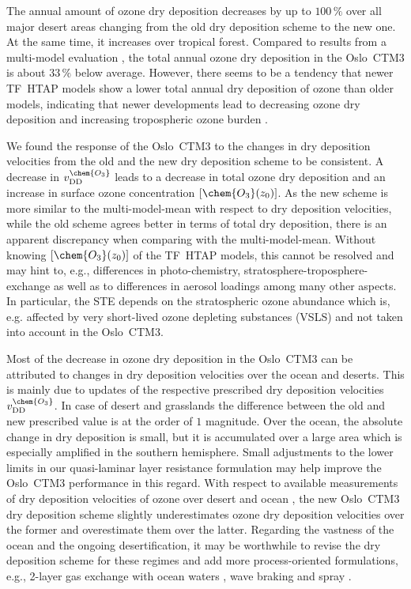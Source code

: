 \documentclass[gmd, manuscript]{copernicus}
\begin{document}
The annual amount of ozone dry deposition decreases by up to $100\,\unit{\%}$ over all major desert areas changing from the old dry deposition scheme to the new one. At the same time, it increases over tropical forest. Compared to results from a multi-model evaluation \citep{ACP:Hardacre2015}, the total annual ozone dry deposition in the Oslo~CTM3 is about $33\,\unit{\%}$ below average. However, there seems to be a tendency that newer TF~HTAP models show a lower total annual dry deposition of ozone than older models, indicating that newer developments lead to decreasing ozone dry deposition and increasing tropospheric ozone burden \citep[e.g.,][]{ACP:Luhar2017,ACP:Luhar2018,AE:Hu2017}.

We found the response of the Oslo~CTM3 to the changes in dry deposition velocities from the old and the new dry deposition scheme to be consistent. A decrease in $v_\text{DD}^\chem{O_3}$ leads to a decrease in total ozone dry deposition and an increase in surface ozone concentration $[\chem{O_3}(z_0)]$. As the new scheme is more similar to the multi-model-mean \citep{ACP:Hardacre2015} with respect to dry deposition velocities, while the old scheme agrees better in terms of total dry deposition, there is an apparent discrepancy when comparing with the multi-model-mean. Without knowing $[\chem{O_3}(z_0)]$ of the TF~HTAP models, this cannot be resolved and may hint to, e.g., differences in photo-chemistry, stratosphere-troposphere-exchange as well as to differences in aerosol loadings among many other aspects. In particular, the STE depends on the stratospheric ozone abundance which is, e.g. affected by very short-lived ozone depleting substances (VSLS) \citep{JGR:Warwick2006, ACP:Ziska2013, ACP:Hossaini2016, ACP:Falk2017} and not taken into account in the Oslo~CTM3.

Most of the decrease in ozone dry deposition in the Oslo~CTM3 can be attributed to changes in dry deposition velocities over the ocean and deserts. This is mainly due to updates of the respective prescribed dry deposition velocities $v_\text{DD}^\chem{O_3}$. In case of desert and grasslands the difference between the old and new prescribed value is at the order of $1$ magnitude. Over the ocean, the absolute change in dry deposition is small, but it is accumulated over a large area which is especially amplified in the southern hemisphere. Small adjustments to the lower limits in our quasi-laminar layer resistance formulation may help improve the Oslo~CTM3 performance in this regard. With respect to available measurements of dry deposition velocities of ozone over desert \citep{AE:Gusten1995} and ocean \citep{JGR:Helmig2012}, the new Oslo~CTM3 dry deposition scheme slightly underestimates ozone dry deposition velocities over the former and overestimate them over the latter. Regarding the vastness of the ocean and the ongoing desertification, it may be worthwhile to revise the dry deposition scheme for these regimes and add more process-oriented formulations, e.g., 2-layer gas exchange with ocean waters \citep{ACP:Luhar2017, ACP:Luhar2018}, wave braking and spray \citep{ACP:Pozzer2006}.
\end{document}
